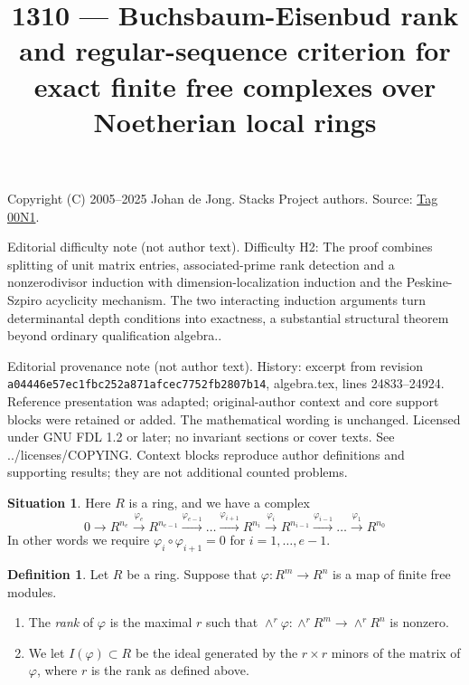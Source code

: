 \documentclass{amsart}
\theoremstyle{plain}
\theoremstyle{definition}
\newtheorem{definition}[subsection]{Definition}
\newtheorem{situation}[subsection]{Situation}
\theoremstyle{remark}
\numberwithin{equation}{subsection}
\begin{document}
\title[Stacks Project, Tag 00N1]{1310 --- Buchsbaum-Eisenbud rank and regular-sequence criterion for exact finite free complexes over Noetherian local rings}
\maketitle
\noindent Copyright (C) 2005--2025 Johan de Jong. Stacks Project authors. Source: \href{https://stacks.math.columbia.edu/tag/00N1}{Tag 00N1}.

\noindent Editorial difficulty note (not author text). Difficulty H2: The proof combines splitting of unit matrix entries, associated-prime rank detection and a nonzerodivisor induction with dimension-localization induction and the Peskine-Szpiro acyclicity mechanism. The two interacting induction arguments turn determinantal depth conditions into exactness, a substantial structural theorem beyond ordinary qualification algebra..

\noindent Editorial provenance note (not author text). History: excerpt from revision \texttt{a0444\allowbreak 6e57e\allowbreak c1fbc\allowbreak 252a8\allowbreak 71afc\allowbreak ec775\allowbreak 2fb28\allowbreak 07b14}, algebra.tex, lines 24833--24924. Reference presentation was adapted; original-author context and core support blocks were retained or added. The mathematical wording is unchanged. Licensed under GNU FDL 1.2 or later; no invariant sections or cover texts. See ../licenses/COPYING. Context blocks reproduce author definitions and supporting results; they are not additional counted problems.

\begin{situation}
\label{situation-complex}
Here $R$ is a ring, and we have a complex
$$
0
\to
R^{n_e}
\xrightarrow{\varphi_e}
R^{n_{e-1}}
\xrightarrow{\varphi_{e-1}}
\ldots
\xrightarrow{\varphi_{i + 1}}
R^{n_i}
\xrightarrow{\varphi_i}
R^{n_{i-1}}
\xrightarrow{\varphi_{i-1}}
\ldots
\xrightarrow{\varphi_1}
R^{n_0}
$$
In other words we require $\varphi_i \circ \varphi_{i + 1} = 0$
for $i = 1, \ldots, e - 1$.
\end{situation}

\begin{definition}
\label{definition-rank}
Let $R$ be a ring. Suppose that $\varphi : R^m \to R^n$ is a map
of finite free modules.
\begin{enumerate}
\item The {\it rank} of $\varphi$ is the maximal $r$ such that
$\wedge^r \varphi : \wedge^r R^m \to \wedge^r R^n$ is nonzero.
\item We let $I(\varphi) \subset R$ be the ideal generated by
the $r \times r$ minors of the matrix of $\varphi$, where $r$
is the rank as defined above.
\end{enumerate}
\end{definition}
\end{document}
